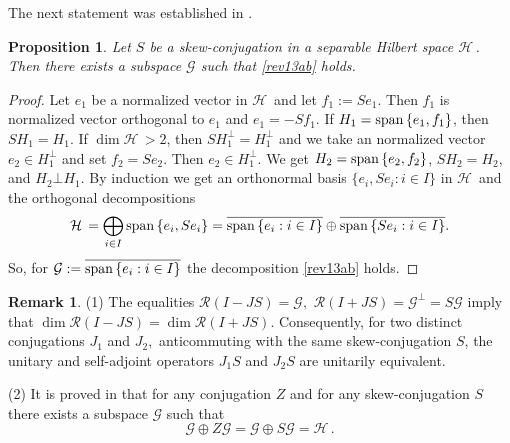 \documentclass[12pt]{amsart}
\newcommand{\cR}{\mathcal{R}}
\newtheorem{prop}[thm]{Proposition}
\theoremstyle{definition}
\newtheorem{rem}[thm]{Remark}
\newcommand{\cH}{\mathcal{H}\,}
\newcommand{\cG}{\mathcal{G}}
\begin{document}
The next statement  was established in \cite{galindo}.
\begin{prop}\label{rev18aaa}
Let $S$ be a skew-conjugation in a separable Hilbert space $\cH$.
Then there exists a subspace $\cG$ such that \eqref{rev13ab} holds.
\end{prop}
\begin{proof}
Let $e_1$ be a normalized vector in $\cH$ and let $f_1:=Se_1$. Then $f_1$ is normalized vector orthogonal to $e_1$ and $e_1=-Sf_1$. If
$H_1={\rm span\,}\{e_{1},f_{1}\}$, then $SH_1=H_1$. If $\dim \cH> 2$, then $SH_1^\perp=H_1^\perp$ and  we take an normalized vector $e_2\in H_1^\perp$ and set $f_2=Se_2$. Then $e_2\in H_1^\perp.$  We get $H_2={\rm span\,}\{e_{2},f_2\}$, $SH_2=H_2$, and $H_2\bot H_1$.
By induction we get an orthonormal basis $\{e_i, Se_i: i\in I\}$ in $\cH$ and the orthogonal decompositions
$$\cH=\bigoplus\limits_{i\in I}{\rm span\,}\{e_{i},Se_{i}\}= \overline{{\rm span\,}\{e_{i}:i\in I \}}\oplus\overline{{\rm span\,}\{Se_{i}:i\in I \}}.$$
So, for $\cG:=\overline{{\rm span\,}\{e_{i}:i\in I \}}$ the decomposition \eqref{rev13ab} holds.

 \end{proof}

\begin{rem}\label{rev13a}
(1) The equalities $\cR(I-JS)=\cG,$ $\cR(I+JS)=\cG^\perp=S\cG$ imply that $\dim\cR(I-JS)=\dim\cR(I+JS)$. Consequently, for two distinct conjugations $J_1$ and $J_2,$ anticommuting with the same skew-conjugation $S$, the unitary and self-adjoint operators $J_1S$ and $J_2S$ are unitarily equivalent.

(2)
It is proved in \cite[Lemma 7]{Luc} that for any conjugation $Z$ and for any skew-conjugation $S$ there exists a subspace $\cG$ such that
$$\cG\oplus Z\cG=\cG\oplus S\cG=\cH.$$
\end{rem}
\end{document}
